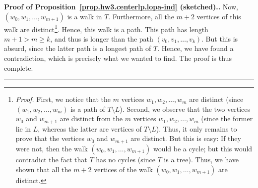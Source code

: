 \documentclass[numbers=enddot,12pt,final,onecolumn,notitlepage]{scrartcl}%
\theoremstyle{definition}
\newenvironment{proof}[1][Proof]{\noindent\textbf{#1.} }{\ \rule{0.5em}{0.5em}}
\newcommand{\tup}[1]{\left( #1 \right)}
\begin{document}
\begin{proof}[Proof of Proposition~\ref{prop.hw3.centerlp.lopa-ind}
(sketched).]
Now, $\tup{w_0, w_1, \ldots, w_{m+1}}$ is a walk in $T$.
Furthermore, all the $m+2$ vertices of this walk are
distinct\footnote{\textit{Proof.}
  First, we notice that the $m$
  vertices $w_1, w_2, \ldots, w_m$ are distinct (since
  $\tup{w_1, w_2, \ldots, w_m}$ is a path of $T \setminus L$).
  Second, we observe that the two vertices $w_0$ and $w_{m+1}$ are
  distinct from the $m$ vertices $w_1, w_2, \ldots, w_m$ (since the
  former lie in $L$, whereas the latter are vertices of
  $T \setminus L$).
  Thus, it only remains to prove that the vertices $w_0$ and $w_{m+1}$
  are distinct.
  But this is easy:
  If they were not, then the walk $\tup{w_0, w_1, \ldots, w_{m+1}}$
  would be a cycle; but this would contradict the fact that $T$ has no
  cycles (since $T$ is a tree).
  Thus, we have shown that all the $m+2$ vertices of the walk
  $\tup{w_0, w_1, \ldots, w_{m+1}}$ are distinct.}.
Hence, this walk is a path.
This path has length $m+1 > m \geq k$, and thus is longer than the
path $\tup{v_0, v_1, \ldots, v_k}$.
But this is absurd, since the latter path is a longest path of $T$.
Hence, we have found a contradiction, which is precisely what we
wanted to find.
The proof is thus complete.
\end{proof}
\end{document}
